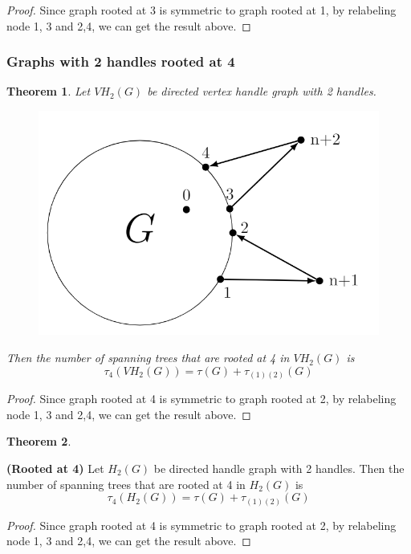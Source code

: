 \documentclass[twoside,11pt]{article}
\newtheorem{theorem}{Theorem}[section]
\numberwithin{equation}{section} \DeclareMathOperator{\Var}{Var}
\newcommand{\bpf}{\begin{proof}}
\newcommand{\epf}{\end{proof}}
\newcommand{\bthm}{\begin{theorem}}
\newcommand{\ethm}{\end{theorem}}
\begin{document}
\bpf
Since graph rooted at 3 is symmetric to graph rooted at 1, by relabeling node 1, 3 and 2,4, we can get the result above.
\epf

\subsubsection{Graphs with 2 handles rooted at 4}
\bthm
Let $VH_2(G)$ be directed vertex handle graph with 2 handles. 
\begin{figure}[H]
    \centering
    \includegraphics[scale=0.4]{tik_2handles.PNG}
\end{figure}
Then the number of spanning trees that are rooted at 4 in $VH_2(G)$ is \[
\tau_4(VH_2(G)) = \tau(G) + \tau_{(1)(2)}(G)
\]
\ethm
\bpf
Since graph rooted at 4 is symmetric to graph rooted at 2, by relabeling node 1, 3 and 2,4, we can get the result above.
\epf

\bthm\label{rooted 4} 

\ethm
{\bf (Rooted at 4)}
Let $H_2(G)$ be directed handle graph with 2 handles. Then the number of spanning trees that are rooted at 4 in $H_2(G)$ is \[
\tau_4(H_2(G)) = \tau(G) + \tau_{(1)(2)}(G)
\]
\bpf
Since graph rooted at 4 is symmetric to graph rooted at 2, by relabeling node 1, 3 and 2,4, we can get the result above.
\epf
\end{document}
